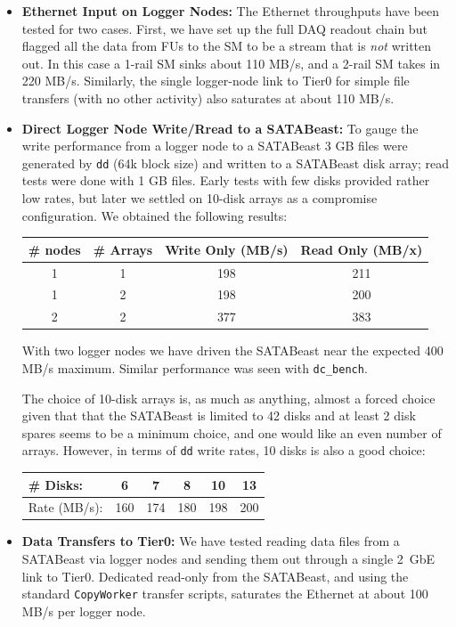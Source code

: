 \begin{itemize}
  \item {\bf Ethernet Input on Logger Nodes:} The Ethernet throughputs have been tested for two cases.
First, we have set up the full DAQ readout chain but flagged all the data from FUs to the SM
to be a stream that is {\it not} written out. In this case a 1-rail SM sinks about 110 MB/s,
and a 2-rail SM takes in 220 MB/s.
Similarly, the single logger-node link to Tier0 for simple file transfers (with no other activity)
also saturates  at about  110 MB/s.
  \item {\bf Direct Logger Node Write/Rread to a SATABeast:} To gauge the write performance 
from a logger node to a SATABeast 3 GB files were generated by \verb+dd+ (64k block size)
and written to a  SATABeast disk array; read tests were done with 1 GB files. 
Early tests with few disks provided rather low rates, but
later we settled on 10-disk arrays as a compromise configuration. 
We obtained the following results:
\begin{center}
\begin{tabular}{c|c|c|c}
\# nodes   & \# Arrays & Write Only (MB/s) & Read Only (MB/x) \\ \hline
1          &     1     &     198           &    211\\
1          &     2     &     198           &    200\\
2          &     2     &     377           &    383\\ \hline
\end{tabular}
\label{tab:ddrates}
\end{center}
With two logger nodes we have driven the SATABeast near the expected 400 MB/s maximum.
Similar performance was seen with \verb+dc_bench+.

The choice of 10-disk arrays is, as much as anything, almost a forced choice
given that that the SATABeast is limited to 42 disks and at least 2 disk spares
seems to be a minimum choice, and one would like an even number of arrays.
However, in terms of \verb+dd+ write rates, 10 disks is also a good choice:
\begin{center}
\begin{tabular}{l|c|c|c|c|c} \hline
\# Disks:      &   6    &   7    & 8    & 10   &   13\\ \hline
Rate (MB/s):   & 160    & 174    & 180  & 198  &  200\\ \hline
\end{tabular}
\label{tab:ddrates2}
\end{center}
  \item {\bf Data Transfers to Tier0:} We have tested reading data files from
a  SATABeast via logger nodes and sending them out through a single  2~GbE link
to Tier0.
Dedicated read-only from the SATABeast, and using the standard \verb+CopyWorker+
transfer scripts, saturates the Ethernet at about 100 MB/s per logger node.
\end{itemize}

